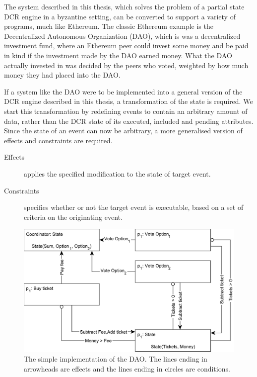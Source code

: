 \documentclass{article}
\begin{document}
	The system described in this thesis, which solves the problem of a partial state DCR engine in a byzantine setting, can be converted to support a variety of programs, much like Ethereum.
	The classic Ethereum example is the Decentralized Autonomous Organization (DAO), which is was a decentralized investment fund, where an Ethereum peer could invest some money and be paid in kind if the investment made by the DAO earned money.
	What the DAO actually invested in was decided by the peers who voted, weighted by how much money they had placed into the DAO.

	If a system like the DAO were to be implemented into a general version of the DCR engine described in this thesis, a transformation of the state is required.
	We start this transformation by redefining events to contain an arbitrary amount of data, rather than the DCR state of its executed, included and pending attributes.
	Since the state of an event can now be arbitrary, a more generalised version of effects and constraints are required.
	\begin{description}
		\item[Effects] applies the specified modification to the state of target event.
		\item[Constraints] specifies whether or not the target event is executable, based on a set of criteria on the originating event.
	\end{description}

	\begin{figure}[t]
  	\includegraphics[width=\textwidth]{figures/dcr-graphs/dao-simple.pdf}
	  \caption{The simple implementation of the DAO.
	  The lines ending in arrowheads are effects and the lines ending in circles are conditions. }
	  \label{fig:dao-simple}
	\end{figure}
\end{document}

